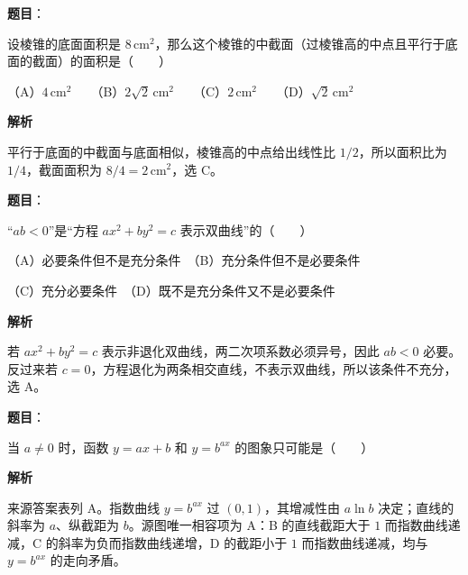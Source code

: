 \begin{answer}

\textbf{题目}：

设棱锥的底面面积是 $8\,\mathrm{cm}^2$，那么这个棱锥的中截面（过棱锥高的中点\allowbreak 且平行于底面的截面）的面积是\allowbreak\mbox{（　　）}

（A）$4\,\mathrm{cm}^2$　　（B）$2\sqrt2\,\mathrm{cm}^2$　　（C）$2\,\mathrm{cm}^2$　　（D）$\sqrt2\,\mathrm{cm}^2$

\textbf{解析}

平行于底面的中截面与底面相似，棱锥高的中点给出线性比 $1/2$，所以面积比为 $1/4$，截面面积为 $8/4=2\,\mathrm{cm}^2$，选 C。


\end{answer}
\begin{answer}

\textbf{题目}：

“$ab<0$”是“方程 $ax^2+by^2=c$ 表示双曲线”的\mbox{（　　）}

（A）必要条件但不是充分条件　（B）充分条件但不是必要条件

（C）充分必要条件　（D）既不是充分条件又不是必要条件

\textbf{解析}

若 $ax^2+by^2=c$ 表示非退化双曲线，两二次项系数必须异号，因此 $ab<0$ 必要。反过来若 $c=0$，方程退化为两条相交直线，不表示双曲线，所以该条件不充分，选 A。


\end{answer}
\begin{answer}

\textbf{题目}：

当 $a\ne0$ 时，函数 $y=ax+b$ 和 $y=b^{ax}$ 的图象只可能是\mbox{（　　）}
\nopagebreak[4]
\begin{center}\end{center}
\nopagebreak[4]
\textbf{解析}

来源答案表列 A。指数曲线 $y=b^{ax}$ 过 $(0,1)$，其增减性由 $a\ln b$ 决定；直线的斜率为 $a$、纵截距为 $b$。源图唯一相容项为 A：B 的直线截距大于 $1$ 而指数曲线递减，C 的斜率为负而指数曲线递增，D 的截距小于 $1$ 而指数曲线递减，均与 $y=b^{ax}$ 的走向矛盾。


\end{answer}
